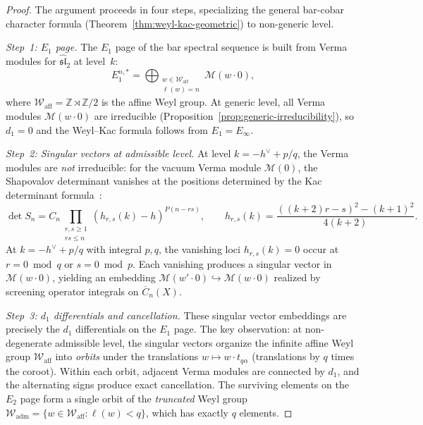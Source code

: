 \begin{proof}
The argument proceeds in four steps, specializing the general
bar-cobar character formula
(Theorem~\ref{thm:weyl-kac-geometric}) to non-generic level.

\emph{Step~1: $E_1$ page.}
The $E_1$ page of the bar spectral sequence is built from
Verma modules for $\widehat{\mathfrak{sl}}_2$ at level~$k$:
\[
E_1^{n,*} = \bigoplus_{\substack{w \in \mathcal{W}_{\mathrm{aff}} \\
\ell(w) = n}} \mathcal{M}(w \cdot 0),
\]
where $\mathcal{W}_{\mathrm{aff}} = \mathbb{Z} \rtimes \mathbb{Z}/2$
is the affine Weyl group.  At generic level, all Verma modules
$\mathcal{M}(w \cdot 0)$ are irreducible
(Proposition~\ref{prop:generic-irreducibility}), so $d_1 = 0$ and
the Weyl--Kac formula follows from $E_1 = E_\infty$.

\emph{Step~2: Singular vectors at admissible level.}
At level $k = -h^\vee + p/q$, the Verma modules are \emph{not}
irreducible: for the vacuum Verma module $\mathcal{M}(0)$, the
Shapovalov determinant vanishes at the positions determined by
the Kac determinant formula~\cite{Kac}:
\[
\det S_n = C_n \prod_{\substack{r,s \geq 1 \\ rs \leq n}}
(h_{r,s}(k) - h)^{P(n-rs)},
\qquad
h_{r,s}(k) = \frac{((k+2)r - s)^2 - (k+1)^2}{4(k+2)}.
\]
At $k = -h^\vee + p/q$ with integral $p,q$, the vanishing loci
$h_{r,s}(k) = 0$ occur at $r = 0 \bmod q$ or $s = 0 \bmod p$.
Each vanishing produces a singular vector in $\mathcal{M}(w \cdot 0)$,
yielding an embedding
$\mathcal{M}(w' \cdot 0) \hookrightarrow \mathcal{M}(w \cdot 0)$
realized by screening operator integrals on $\overline{C}_n(X)$.

\emph{Step~3: $d_1$ differentials and cancellation.}
These singular vector embeddings are precisely the $d_1$
differentials on the $E_1$ page.  The key observation: at
non-degenerate admissible level, the singular vectors organize
the infinite affine Weyl group $\mathcal{W}_{\mathrm{aff}}$ into
\emph{orbits} under the translations $w \mapsto w \cdot t_{q\alpha}$
(translations by $q$ times the coroot).  Within each orbit, adjacent
Verma modules are connected by $d_1$, and the alternating signs
produce exact cancellation.  The surviving elements on the $E_2$
page form a single orbit of the \emph{truncated} Weyl group
$\mathcal{W}_{\mathrm{adm}} = \{w \in \mathcal{W}_{\mathrm{aff}}
: \ell(w) < q\}$, which has exactly $q$ elements.


\end{proof}

